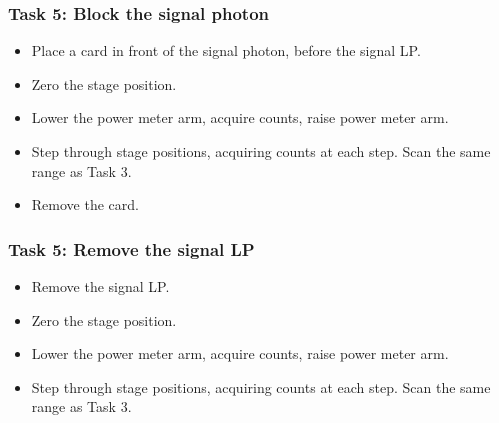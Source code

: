 \documentclass{article}
\begin{document}
\subsubsection*{Task 5: Block the signal photon}

\begin{itemize}
\item Place a card in front of the signal photon, before the signal LP.
\item Zero the stage position.
\item Lower the power meter arm, acquire counts, raise power meter arm.  
\item Step through stage positions, acquiring counts at each step. Scan the same range as Task 3.
\item Remove the card.
\end{itemize}

\subsubsection*{Task 5: Remove the signal LP}

\begin{itemize}
\item Remove the signal LP.
\item Zero the stage position.
\item Lower the power meter arm, acquire counts, raise power meter arm.  
\item Step through stage positions, acquiring counts at each step. Scan the same range as Task 3.
\end{itemize}
\end{document}
